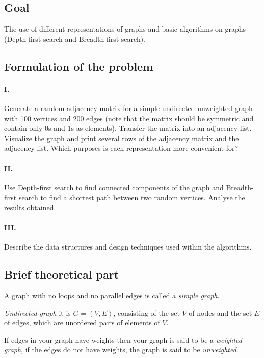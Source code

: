 \newpage
\subsection{Goal}\label{subsec:goal}

The use of different representations of graphs and basic algorithms on graphs (Depth-first search and Breadth-first search).

\subsection{Formulation of the problem}\label{subsec:formulation-of-the-problem}

\paragraph{I.} Generate a random adjacency matrix for a simple undirected unweighted graph with 100 vertices and 200 edges (note that the matrix should be symmetric and contain only 0s and 1s as elements).
Transfer the matrix into an adjacency list.
Visualize the graph and print several rows of the adjacency matrix and the adjacency list.
Which purposes is each representation more convenient for?

\paragraph{II.} Use Depth-first search to find connected components of the graph and Breadth-first search to find a shortest path between two random vertices.
Analyse the results obtained.

\paragraph{III.} Describe the data structures and design techniques used within the algorithms.

\subsection{Brief theoretical part}\label{subsec:brief-theoretical-part}

A graph with no loops and no parallel edges is called a \textit{simple graph}.

\textit{Undirected graph} it is $G = (V, E)$, consisting of the set $V$ of nodes and the set $E$ of edges, which are unordered pairs of elements of $V$.

If edges in your graph have weights then your graph is said to be a \textit{weighted graph}, if the edges do not have weights, the graph is said to be \textit{unweighted}.


